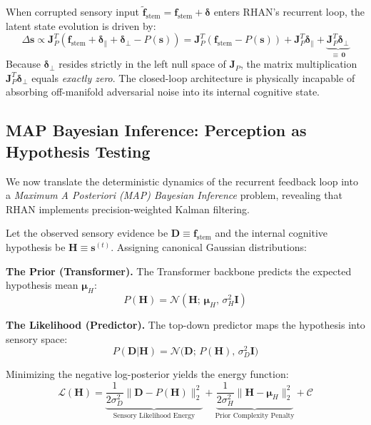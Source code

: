 \documentclass[12pt,a4paper]{article}
\begin{document}
When corrupted sensory input
$\tilde{\mathbf{f}}_{\mathrm{stem}} = \mathbf{f}_{\mathrm{stem}} + \bm{\delta}$
enters RHAN's recurrent loop, the latent state evolution is driven by:
\begin{equation}
  \Delta \mathbf{s} \propto \mathbf{J}_P^T \left(
  \mathbf{f}_{\mathrm{stem}} + \bm{\delta}_{\parallel} +
  \bm{\delta}_{\perp} - P(\mathbf{s}) \right)
  = \mathbf{J}_P^T \left( \mathbf{f}_{\mathrm{stem}} - P(\mathbf{s}) \right)
  + \mathbf{J}_P^T \bm{\delta}_{\parallel}
  + \underbrace{\mathbf{J}_P^T \bm{\delta}_{\perp}}_{\equiv\, \mathbf{0}}
\end{equation}
Because $\bm{\delta}_{\perp}$ resides strictly in the left null space of
$\mathbf{J}_P$, the matrix multiplication
$\mathbf{J}_P^T \bm{\delta}_{\perp}$ equals \textit{exactly zero}. The
closed-loop architecture is physically incapable of absorbing off-manifold
adversarial noise into its internal cognitive state.

\subsection{MAP Bayesian Inference: Perception as Hypothesis Testing}
\label{sec:bayesian}

We now translate the deterministic dynamics of the recurrent feedback loop
into a \textit{Maximum A Posteriori (MAP) Bayesian Inference} problem,
revealing that RHAN implements precision-weighted Kalman filtering.

Let the observed sensory evidence be
$\mathbf{D} \equiv \mathbf{f}_{\mathrm{stem}}$ and the internal cognitive
hypothesis be $\mathbf{H} \equiv \mathbf{s}^{(t)}$. Assigning canonical
Gaussian distributions:

\textbf{The Prior (Transformer).} The Transformer backbone predicts the
expected hypothesis mean $\bm{\mu}_H$:
\begin{equation}
  P(\mathbf{H}) = \mathcal{N}(\mathbf{H};\, \bm{\mu}_H,\, \sigma_H^2 \mathbf{I})
\end{equation}

\textbf{The Likelihood (Predictor).} The top-down predictor maps the
hypothesis into sensory space:
\begin{equation}
  P(\mathbf{D}|\mathbf{H}) = \mathcal{N}\big(\mathbf{D};\, P(\mathbf{H}),\,
  \sigma_D^2 \mathbf{I}\big)
\end{equation}

Minimizing the negative log-posterior yields the energy function:
\begin{equation}
  \mathcal{L}(\mathbf{H}) =
  \underbrace{\frac{1}{2\sigma_D^2} \|\mathbf{D} - P(\mathbf{H})\|_2^2}_{\text{Sensory Likelihood Energy}}
  + \underbrace{\frac{1}{2\sigma_H^2} \|\mathbf{H} - \bm{\mu}_H\|_2^2}_{\text{Prior Complexity Penalty}}
  + \mathcal{C}
  \label{eq:bayesian_energy}
\end{equation}
\end{document}

